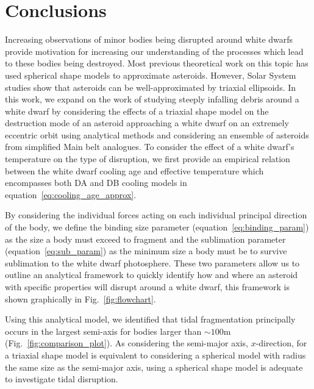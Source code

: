 \documentclass[fleqn,usenatbib]{mnras}
\begin{document}
\section{Conclusions} \label{sec:conclusions}
Increasing observations of minor bodies being disrupted around white dwarfs provide motivation for increasing our understanding of the processes which lead to these bodies being destroyed.
Most previous theoretical work on this topic has used spherical shape models to approximate asteroids. However, Solar System studies show that asteroids can be well-approximated by triaxial ellipsoids.
In this work, we expand on the work of \cite{Brown2017} studying steeply infalling debris around a white dwarf by considering the effects of a triaxial shape model on the destruction mode of an asteroid approaching a white dwarf on an extremely eccentric orbit using analytical methods and considering an ensemble of asteroids from simplified Main belt analogues. 
To consider the effect of a white dwarf's temperature on the type of disruption, we first provide an empirical relation between the white dwarf cooling age and effective temperature which encompasses both DA and DB cooling models in equation~\ref{eq:cooling_age_approx}. 

By considering the individual forces acting on each individual principal direction of the body, we define the binding size parameter (equation~\ref{eq:binding_param}) as the size a body must exceed to fragment and the sublimation parameter (equation~\ref{eq:sub_param}) as the minimum size a body must be to survive sublimation to the white dwarf photosphere.
These two parameters allow us to outline an analytical framework to quickly identify how and where an asteroid with specific properties will disrupt around a white dwarf, this framework is shown graphically in Fig.~\ref{fig:flowchart}. 

Using this analytical model, we identified that tidal fragmentation principally occurs in the largest semi-axis for bodies larger than $\sim 100$m (Fig.~\ref{fig:comparison_plot}).
As considering the semi-major axis, $x$-direction, for a triaxial shape model is equivalent to considering a spherical model with radius the same size as the semi-major axis, using a spherical shape model is adequate to investigate tidal disruption. 
\end{document}
